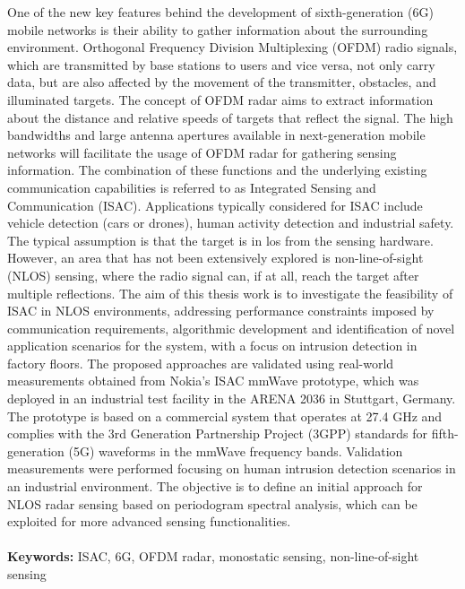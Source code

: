 \documentclass{Configuration_Files/PoliMi3i_thesis}
\begin{document}
One of the new key features behind the development of sixth-generation (6G) mobile networks is their ability to gather information about the surrounding environment. 
Orthogonal Frequency Division Multiplexing (OFDM) radio signals, which are transmitted by base stations to users and vice versa, not only carry data, but are also affected by the movement of the transmitter, obstacles, and illuminated targets.
The concept of OFDM radar aims to extract information about the distance and relative speeds of targets that reflect the signal.
The high bandwidths and large antenna apertures available in next-generation mobile networks will facilitate the usage of OFDM radar for gathering sensing information. 
The combination of these functions and the underlying existing communication capabilities is referred to as Integrated Sensing and Communication (ISAC).
Applications typically considered for ISAC include vehicle detection (cars or drones), human activity detection and industrial safety. 
The typical assumption is that the target is in \gls{los} from the sensing hardware. 
However, an area that has not been extensively explored is non-line-of-sight (NLOS) sensing, where the radio signal can, if at all, reach the target after multiple reflections.
The aim of this thesis work is to investigate the feasibility of ISAC in NLOS environments, addressing performance constraints imposed by communication requirements, algorithmic development and identification of novel application scenarios for the system, with a focus on intrusion detection in factory floors.
The proposed approaches are validated using real-world measurements obtained from Nokia's ISAC mmWave prototype, which was deployed in an industrial test facility in the ARENA 2036 in Stuttgart, Germany.
The prototype is based on a commercial system that operates at 27.4 GHz and complies with the 3rd Generation Partnership Project (3GPP) standards for fifth-generation (5G) waveforms in the mmWave frequency bands. 
Validation measurements were performed focusing on human intrusion detection scenarios in an industrial environment.
The objective is to define an initial approach for NLOS radar sensing based on periodogram spectral analysis, which can be exploited for more advanced sensing functionalities.
\\
\\
\textbf{Keywords:} ISAC, 6G, OFDM radar, monostatic sensing, non-line-of-sight sensing %
\end{document}
